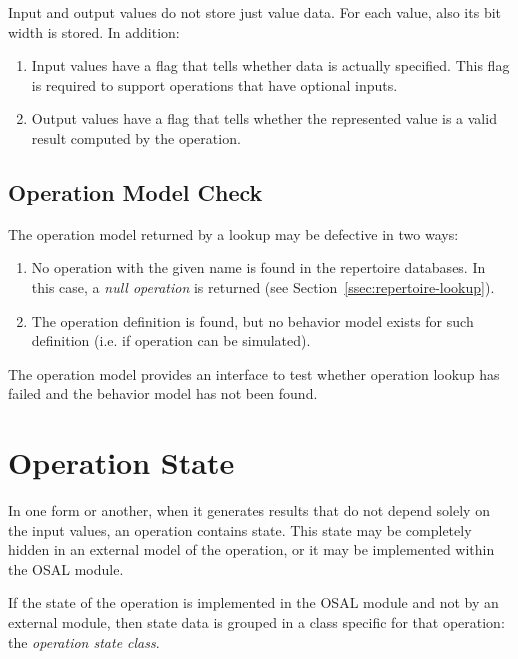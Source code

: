 \documentclass[twoside]{tce}
\begin{document}
Input and output values do not store just value data.  For each value, also
its bit width is stored.  In addition:
\begin{enumerate}
\item %
  Input values have a flag that tells whether data is actually specified.
  This flag is required to support operations that have optional inputs.
\item %
  Output values have a flag that tells whether the represented value is a
  valid result computed by the operation.
\end{enumerate}

\subsection{Operation Model Check}
\label{ssec:oper-check}

The operation model returned by a lookup may be defective in two ways:
\begin{enumerate}
\item %
  No operation with the given name is found in the repertoire databases.
  In this case, a \emph{null operation} is returned (see
  Section~\ref{ssec:repertoire-lookup}).
\item %
  The operation definition is found, but no behavior model exists for such
  definition (i.e. if operation can be simulated).
\end{enumerate}

The operation model provides an interface to test whether operation lookup
has failed and the behavior model has not been found.

\section{Operation State}
\label{sec:oper-state}

In one form or another, when it generates results that do not depend solely
on the input values, an operation contains state.  This state may be
completely hidden in an external model of the operation,%
%
or it may be implemented within the OSAL module.

If the state of the operation is implemented in the OSAL module and not by
an external module, then state data is grouped in a class specific for that
operation: the \emph{operation state class}.
\end{document}
